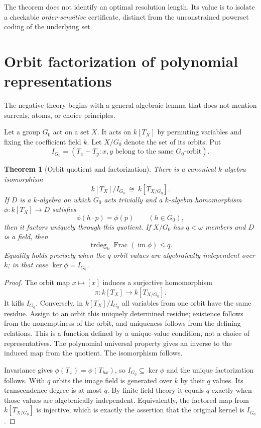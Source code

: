 \documentclass[11pt,letterpaper]{article}
\newtheorem{theorem}{Theorem}[section]
\theoremstyle{definition}
\theoremstyle{remark}
\newcommand{\Frac}{\operatorname{Frac}}
\newcommand{\trdeg}{\operatorname{trdeg}}
\newcommand{\im}{\operatorname{im}}
\begin{document}
The theorem does not identify an optimal resolution length. Its value is to isolate a checkable \emph{order-sensitive} certificate, distinct from the unconstrained powerset coding of the underlying set.

\section{Orbit factorization of polynomial representations}
\label{hset:kw:sec:orbits}

The negative theory begins with a general algebraic lemma that does not mention surreals, atoms, or choice principles.

Let a group $G_0$ act on a set $X$. It acts on $k[T_X]$ by permuting variables and fixing the coefficient field $k$. Let $X/G_0$ denote the set of its orbits. Put
\begin{equation}\label{hset:kw:eq:orbitideal}
I_{G_0}=(T_x-T_y:x,y\text{ belong to the same }G_0\text{-orbit}).
\end{equation}

\begin{theorem}[Orbit quotient and factorization]\label{hset:kw:thm:orbit}
There is a canonical $k$-algebra isomorphism
\[
k[T_X]/I_{G_0}\ \cong\ k[T_{X/G_0}].
\]
If $D$ is a $k$-algebra on which $G_0$ acts trivially and a $k$-algebra homomorphism $\phi:k[T_X]\to D$ satisfies
\[
\phi(h\cdot p)=\phi(p)\qquad(h\in G_0),
\]
then it factors uniquely through this quotient. If $X/G_0$ has $q<\omega$ members and $D$ is a field, then
\begin{equation}\label{hset:kw:eq:orbitbound}
\trdeg_k\Frac(\im\phi)\le q.
\end{equation}
Equality holds precisely when the $q$ orbit values are algebraically independent over $k$; in that case $\ker\phi=I_{G_0}$.
\end{theorem}
\begin{proof}
The orbit map $x\mapsto[x]$ induces a surjective homomorphism
\[
\pi:k[T_X]\longrightarrow k[T_{X/G_0}].
\]
It kills $I_{G_0}$. Conversely, in $k[T_X]/I_{G_0}$ all variables from one orbit have the same residue. Assign to an orbit this uniquely determined residue; existence follows from the nonemptiness of the orbit, and uniqueness follows from the defining relations. This is a function defined by a unique-value condition, not a choice of representatives. The polynomial universal property gives an inverse to the induced map from the quotient. The isomorphism follows.

Invariance gives $\phi(T_x)=\phi(T_{hx})$, so $I_{G_0}\subseteq\ker\phi$ and the unique factorization follows. With $q$ orbits the image field is generated over $k$ by their $q$ values. Its transcendence degree is at most $q$. By finite field theory it equals $q$ exactly when those values are algebraically independent. Equivalently, the factored map from $k[T_{X/G_0}]$ is injective, which is exactly the assertion that the original kernel is $I_{G_0}$.
\end{proof}
\end{document}
